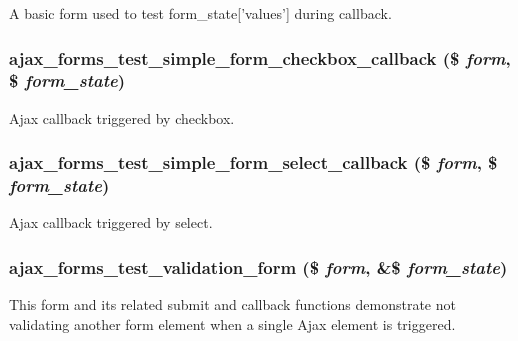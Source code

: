 \label{ajax__forms__test_8module_a012279e867d0f7f4665d6d561f6f7b79}
A basic form used to test form\_\-state\mbox{[}'values'\mbox{]} during callback. \hypertarget{ajax__forms__test_8module_aead84f727c96c6c9643dcf6dd6b12377}{
\subsubsection[{ajax\_\-forms\_\-test\_\-simple\_\-form\_\-checkbox\_\-callback}]{\setlength{\rightskip}{0pt plus 5cm}ajax\_\-forms\_\-test\_\-simple\_\-form\_\-checkbox\_\-callback (\$ {\em form}, \/  \$ {\em form\_\-state})}}
\label{ajax__forms__test_8module_aead84f727c96c6c9643dcf6dd6b12377}
Ajax callback triggered by checkbox. \hypertarget{ajax__forms__test_8module_aa01a2ea5897e682d5b149bca1b5bcaf5}{
\subsubsection[{ajax\_\-forms\_\-test\_\-simple\_\-form\_\-select\_\-callback}]{\setlength{\rightskip}{0pt plus 5cm}ajax\_\-forms\_\-test\_\-simple\_\-form\_\-select\_\-callback (\$ {\em form}, \/  \$ {\em form\_\-state})}}
\label{ajax__forms__test_8module_aa01a2ea5897e682d5b149bca1b5bcaf5}
Ajax callback triggered by select. \hypertarget{ajax__forms__test_8module_a16f5363fcafca108e7c299f6f463abe2}{
\subsubsection[{ajax\_\-forms\_\-test\_\-validation\_\-form}]{\setlength{\rightskip}{0pt plus 5cm}ajax\_\-forms\_\-test\_\-validation\_\-form (\$ {\em form}, \/  \&\$ {\em form\_\-state})}}
\label{ajax__forms__test_8module_a16f5363fcafca108e7c299f6f463abe2}
This form and its related submit and callback functions demonstrate not validating another form element when a single Ajax element is triggered.

